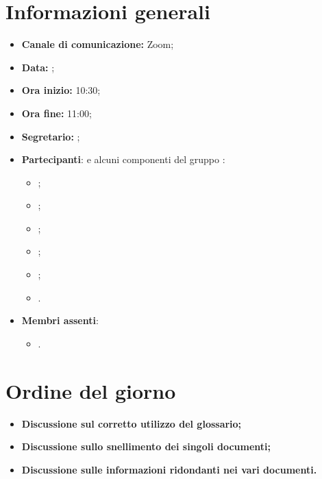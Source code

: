 \section{Informazioni generali}

\begin{itemize}

	\item \textbf{Canale di comunicazione:} Zoom;
	
	\item \textbf{Data:} \DataMeeting{};
	
	\item \textbf{Ora inizio:} 10:30;
	
	\item \textbf{Ora fine:} 11:00;
	
	\item \textbf{Segretario:} \Tommaso{};
	
	\item \textbf{Partecipanti}: e alcuni componenti del gruppo \Gruppo{}:
	
		\begin{itemize}
			\item \Daniele{};
			\item \Davide{};
			\item \Francesco{};
			\item \Giosue{};
			\item \Lucrezia{};
			\item \Tommaso{}.
		\end{itemize}

	\item \textbf{Membri assenti}:
		\begin{itemize}
			\item \Matteo{}.
		\end{itemize}
	\end{itemize}
\section{Ordine del giorno}

\begin{itemize}
	\item\textbf{Discussione sul corretto utilizzo del glossario;}
	\item\textbf{Discussione sullo snellimento dei singoli documenti;}
	\item\textbf{Discussione sulle informazioni ridondanti nei vari documenti.}


\end{itemize}

